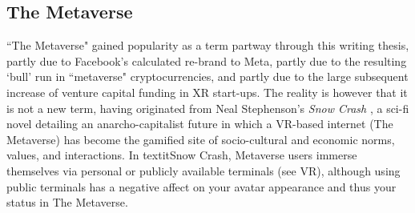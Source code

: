 \subsection{The Metaverse}\label{sec: theory-space-metaverse}
``The Metaverse" gained popularity as a term partway through this writing thesis, partly due to Facebook's calculated re-brand to Meta, partly due to the resulting `bull' run in ``metaverse" cryptocurrencies, and partly due to the large subsequent increase of venture capital funding in XR start-ups. The reality is however that it is not a new term, having originated from Neal Stephenson's \textit{Snow Crash} \citep[]{stephenson1992}, a sci-fi novel detailing an anarcho-capitalist future in which a VR-based internet (The Metaverse) has become the gamified site of socio-cultural and economic norms, values, and interactions. In textit{Snow Crash}, Metaverse users immerse themselves via personal or publicly available terminals (see VR), although using public terminals has a negative affect on your avatar appearance and thus your status in The Metaverse.

